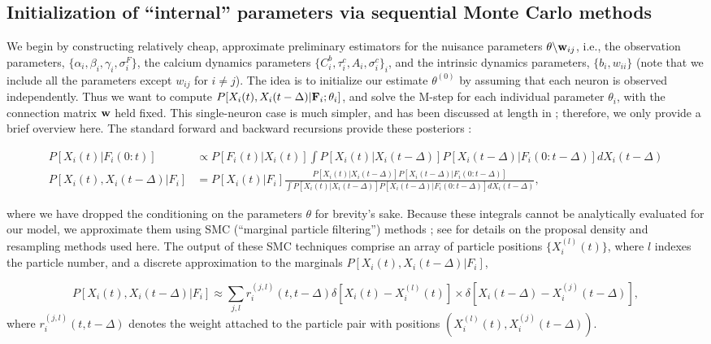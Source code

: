 \subsection{Initialization of ``internal'' parameters via sequential Monte Carlo methods} \label{sec:methods:indep}

We begin by constructing relatively cheap, approximate preliminary estimators for the nuisance parameters $\theta \backslash \mathbf{w}_{ij}$, i.e., the observation parameters, $\{\alpha_i,\beta_i,\gamma_i,\sigma^F_i\}$, the calcium dynamics parameters $\{C^b_i,\tau^c_i, A_i, \sigma^c_i\}_i$, and the intrinsic dynamics parameters, $\{b_i,w_{ii}\}$ (note that we include all the parameters except $w_{ij}$ for $i\neq j$). The idea is to initialize our estimate $\theta^{(0)}$ by assuming that each neuron is observed independently. Thus we want to compute $P[X_i(t), X_i(t-\Delta) | {\bf F}_i; \mathbf{\theta}_i]$, and solve the M-step for each individual parameter $\theta_i$, with the connection matrix $\mathbf{w}$ held fixed. This single-neuron case is much simpler, and has been discussed at length in \cite{Vogelstein2009}; therefore, we only provide a brief overview here. The standard forward and backward recursions provide these posteriors \cite{ShumwayStoffer06}:

\begin{align}
  P[X_i(t) | F_i(0:t)] &\propto P[F_i(t)| X_i(t)] \int P[X_i(t)
| X_i(t-\Delta)] P[X_i(t-\Delta) | F_i(0:t-\Delta)] dX_i(t-\Delta)
\label{eqn:forward} \\ P[X_i(t), X_i(t-\Delta) | F_i] &= P[X_i(t) | F_i]
\frac{P[X_i(t) | X_i(t-\Delta)] P[X_i(t-\Delta) |
F_i(0:t-\Delta)]}{\int P[X_i(t) | X_i(t-\Delta)] P[X_i(t-\Delta) |
F_i(0:t-\Delta)] dX_i(t-\Delta)},
\label{eqn:backward}
\end{align}

where we have dropped the conditioning on the parameters $\theta$ for brevity's sake. Because these integrals cannot be analytically evaluated for our model, we approximate them using SMC (``marginal particle filtering'') methods \cite{DGA00,DFG01,GDW04}; see \cite{Vogelstein2009} for details on the proposal density and resampling methods used here. The output of these SMC techniques comprise an array of particle positions $\{X_i^{(l)}(t)\}$, where $l$ indexes the particle number, and a discrete approximation to the marginals $P[X_i(t), X_i(t-\Delta) | F_i]$,

\begin{equation}
  P[X_i(t), X_i(t-\Delta) | F_i] \approx \sum_{j,l}
  r_i^{(j,l)}(t,t-\Delta) \delta \left[ X_i(t) - X_i^{(l)}(t) \right]
  \times \delta \left[ X_i(t-\Delta) - X_i^{(j)}(t-\Delta) \right],
  \label{eq:particle-fb}
\end{equation}
where $r_i^{(j,l)}(t,t-\Delta)$ denotes the weight attached to the
particle pair with positions $\left( X_i^{(l)}(t), X_i^{(j)}(t-\Delta)
\right)$.


